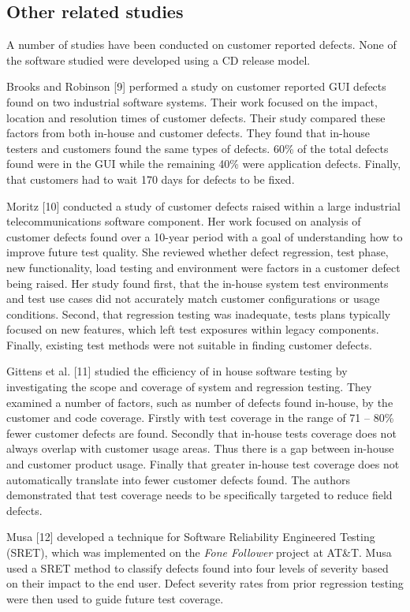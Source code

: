 \documentclass[conference]{IEEEtran}
\begin{document}
\subsection{Other related studies}
A number of studies have been conducted on customer reported defects. None of the software studied were developed using a CD  release model. \par
Brooks and Robinson [9] performed a study on customer reported GUI defects found on two industrial software systems. Their work focused on the impact, location and resolution times of customer defects. Their study compared these factors from both in-house and customer defects. They found that in-house testers and customers found the same types of defects. 60\% of the total defects found were in the GUI while the remaining 40\% were application defects. Finally, that customers had to wait 170 days for defects to be fixed. \par
Moritz [10] conducted a study of customer defects raised within a large industrial telecommunications software component. Her work focused on analysis of customer defects found over a 10-year period with a goal of understanding how to improve future test quality. She reviewed whether defect regression, test phase, new functionality, load testing and environment were factors in a customer defect being raised. Her study found first, that the in-house system test environments and test use cases did not accurately match customer configurations or usage conditions. Second, that regression testing was inadequate, tests plans typically focused on new features,  which left test exposures within legacy components. Finally, existing test methods were not suitable in finding customer defects. \par
 Gittens et al. [11] studied the efficiency of in house software testing by investigating the scope and coverage of system and regression testing. They examined a number of factors, such as number of defects found in-house, by the customer and code coverage. Firstly with test coverage in the range of 71 -- 80\% fewer customer defects are found. Secondly that in-house tests coverage does not always overlap with customer usage areas. Thus there is a gap between in-house and customer product usage. Finally that greater in-house test coverage does not automatically translate into fewer customer defects found. The authors demonstrated that test coverage needs to be specifically targeted to reduce field defects. \par
Musa [12] developed a technique for Software Reliability Engineered Testing (SRET), which was implemented on the \emph{Fone Follower} project at AT\&T. Musa used a SRET method to classify defects found into four levels of severity based on their impact to the end user. Defect severity rates from prior regression testing were then used to guide future test coverage. \par
\end{document}
